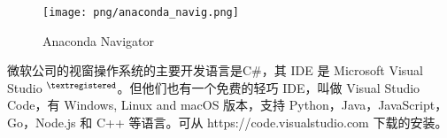 \documentclass[main.tex]{subfiles}
\begin{document}
	

\begin{figure}[h]
	\centering
	\texttt{[image: png/anaconda\_navig.png]}
	\caption{Anaconda Navigator}
	\label{fig:III.1.3}
\end{figure}


微软公司的视窗操作系统的主要开发语言是C\#，其 IDE 是 Microsoft Visual Studio ${}^{\textregistered}$。但他们也有一个免费的轻巧 IDE，叫做 Visual Studio Code，有 Windows, Linux and macOS 版本，支持 Python，Java，JavaScript，Go，Node.js 和 C++ 等语言。可从
https://code.visualstudio.com
下载的安装。
\end{document}
